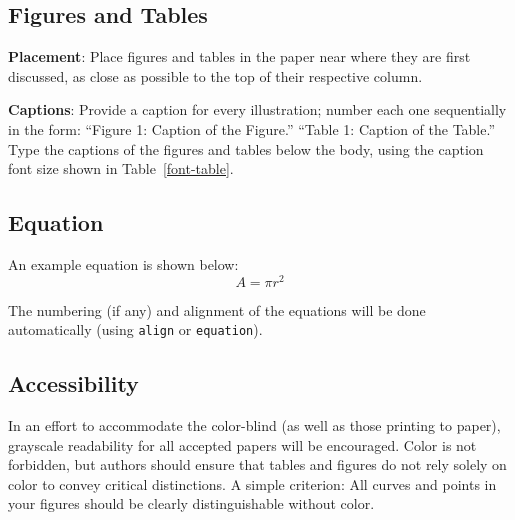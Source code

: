 \documentclass[11pt,a4paper]{article}
\begin{document}
\subsection{Figures and Tables}


\textbf{Placement}: Place figures and tables in the paper near where they are first discussed, as close as possible to the top of their respective column.


\textbf{Captions}: Provide a caption for every illustration; number each one
sequentially in the form:  ``Figure 1: Caption of the Figure.'' ``Table 1:
Caption of the Table.''  Type the captions of the figures and
tables below the body, using the caption font size shown in Table~\ref{font-table}.

\subsection{Equation}
\label{ssec:eqn}

An example equation is shown below:
\begin{equation}
A=\pi r^2
\end{equation}

The numbering (if any) and alignment of the equations will be done automatically (using \verb|align| or \verb|equation|).

\subsection{Accessibility}
\label{ssec:accessibility}

In an effort to accommodate the color-blind (as well as those printing
to paper), grayscale readability for all accepted papers will be
encouraged.  Color is not forbidden, but authors should ensure that
tables and figures do not rely solely on color to convey critical
distinctions.
A simple criterion: All curves and points in your figures should be clearly distinguishable without color.
\end{document}
